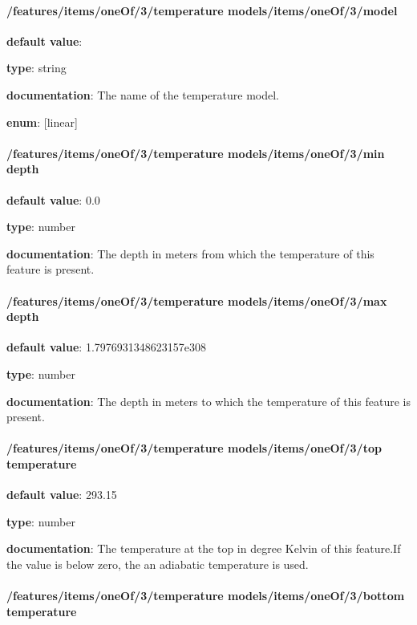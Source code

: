 \paragraph{/features/items/oneOf/3/temperature models/items/oneOf/3/model} \begin{itemized}
\item {\bf default value}: 
\item {\bf type}: string
\item {\bf documentation}: The name of the temperature model.
\item {\bf enum}: [linear]\end{itemized}\paragraph{/features/items/oneOf/3/temperature models/items/oneOf/3/min depth} \begin{itemized}
\item {\bf default value}: 0.0
\item {\bf type}: number
\item {\bf documentation}: The depth in meters from which the temperature of this feature is present.
\end{itemized}\paragraph{/features/items/oneOf/3/temperature models/items/oneOf/3/max depth} \begin{itemized}
\item {\bf default value}: 1.7976931348623157e308
\item {\bf type}: number
\item {\bf documentation}: The depth in meters to which the temperature of this feature is present.
\end{itemized}\paragraph{/features/items/oneOf/3/temperature models/items/oneOf/3/top temperature} \begin{itemized}
\item {\bf default value}: 293.15
\item {\bf type}: number
\item {\bf documentation}: The temperature at the top in degree Kelvin of this feature.If the value is below zero, the an adiabatic temperature is used.
\end{itemized}\paragraph{/features/items/oneOf/3/temperature models/items/oneOf/3/bottom temperature} \begin{itemized}

\end{itemized}
